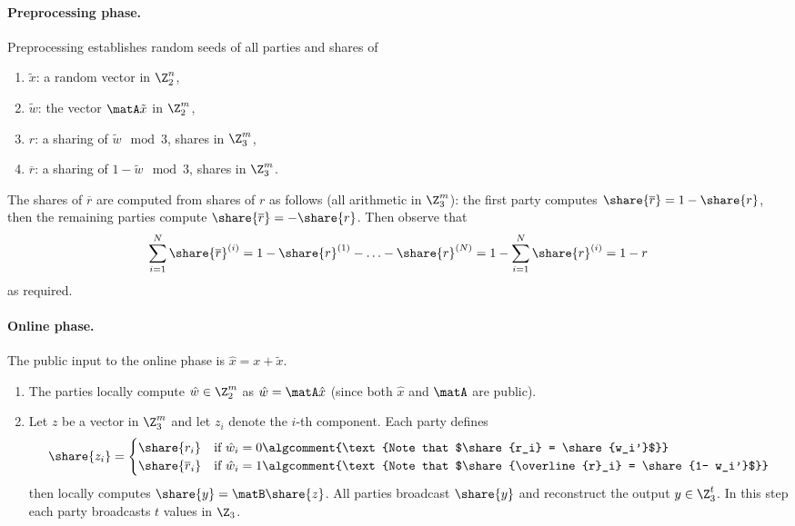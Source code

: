 \paragraph{Preprocessing phase.} Preprocessing establishes random seeds of all parties and shares of
\begin{enumerate}
\item $\tilde{x}$: a random vector in $\Z_2^{n}$,
\item $\tilde{w}$: the vector $\matA \tilde{x}$ in $\Z_2^{m}$,
\item $r$: a sharing of $\tilde{w} \mod 3$, shares in $\Z_3^m$,  
\item $\overline{r}$: a sharing of $1-\tilde{w} \mod 3$, shares in $\Z_3^m$. 
\end{enumerate}
The shares of $\overline{r}$ are computed from shares of $r$ as follows (all arithmetic in $\Z_3^m$): the first
party computes $\share{\overline{r}} = 1 - \share{r}$, then the remaining parties compute
$\share{\overline{r}} = - \share{r}$.  Then observe that
\[\sum_{i=1}^N \share{\overline{r}}^{(i)} = 1 - \share{r}^{(1)} - \ldots - \share{r}^{(N)} = 1 - \sum_{i=1}^{N} \share{r}^{(i)} = 1-r \]
 as required.

\paragraph{Online phase.}
The public input to the online phase is $\hat{x} = x + \tilde{x}$.
\begin{enumerate}

\item The parties locally compute $\hat{w} \in \Z_2^{m}$ as $\hat{w} = \matA\hat{x}$ (since both $\hat{x}$ and $\matA$ are public).

\item Let $z$ be a vector in $\Z_3^m$ and let $z_i$ denote the $i$-th component. Each party defines
\[
    \share{z_i}  = \begin{cases}
                \share{r_i}  & \text{if $\hat{w}_i = 0$} \algcomment{\text{Note that $\share{r_i} = \share{w_i'}$}}\\
                \share{\overline{r}_i}  & \text{if $\hat{w}_i = 1$} \algcomment{\text{Note that $\share{\overline{r}_i} = \share{1- w_i'}$}}\\
            \end{cases}
\]
then locally computes $\share{y} = \matB\share{z}$. All parties broadcast $\share{y}$ and reconstruct the output $y\in\Z_{3}^t$.
In this step each party broadcasts $t$ values in $\Z_3$.
\end{enumerate}

